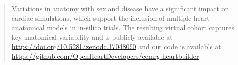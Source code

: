 \documentclass{article}
\begin{document}
\begin{abstract}
    Variations in anatomy with sex and disease have a significant impact on cardiac simulations, 
    which support the inclusion of multiple heart anatomical models in in-silico trials.
    The resulting virtual cohort captures key anatomical variability and is publicly available at 
    \url{https://doi.org/10.5281/zenodo.17048090} and our code is available 
    at \url{https://github.com/OpenHeartDevelopers/cemrg-heartbuilder}.
\end{abstract}










 
\end{document}

